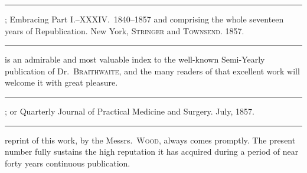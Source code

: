 \fancybreak{* * *}
\footnotesize
{}; Embracing Part I.--XXXIV.\ 1840--1857
and comprising the whole seventeen years of Republication. New York, \textsc{Stringer} and
\textsc{Townsend}. 1857.
\plainbreak{1}
\normalsize

 is an admirable and most valuable index to the well-known
Semi-Yearly publication of Dr.\ \textsc{Braithwaite}, and the many readers of
that excellent work will welcome it with great pleasure.

\fancybreak{* * *}
\footnotesize
{}; or Quarterly Journal of Practical
Medicine and Surgery. July, 1857.
\plainbreak{1}
\normalsize

 reprint of this work, by the Messrs.\ \textsc{Wood}, always comes
promptly. The present number fully sustains the high reputation it
has acquired during a period of near forty years continuous publication.\endinput
